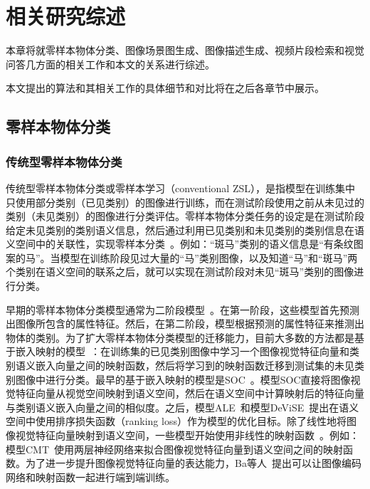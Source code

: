 \chapter{相关研究综述}

本章将就零样本物体分类、图像场景图生成、图像描述生成、视频片段检索和视觉问答几方面的相关工作和本文的关系进行综述。

本文提出的算法和其相关工作的具体细节和对比将在之后各章节中展示。


\section{零样本物体分类}

\subsection{传统型零样本物体分类}
传统型零样本物体分类或零样本学习（conventional ZSL），是指模型在训练集中只使用部分类别（已见类别）的图像进行训练，而在测试阶段使用之前从未见过的类别（未见类别）的图像进行分类评估。零样本物体分类任务的设定是在测试阶段给定未见类别的类别语义信息，然后通过利用已见类别和未见类别的类别信息在语义空间中的关联性，实现零样本分类~\cite{farhadi2009describing,lampert2009learning,romera2015embarrassingly,norouzi2014zero,demirel2017attributes2classname,jiang2017learning}。例如：“斑马”类别的语义信息是“有条纹图案的马”。当模型在训练阶段见过大量的“马”类别图像，以及知道“马”和“斑马”两个类别在语义空间的联系之后，就可以实现在测试阶段对未见“斑马”类别的图像进行分类。

早期的零样本物体分类模型通常为二阶段模型~\cite{lampert2013attribute,norouzi2014zero,al2016recovering,jayaraman2014zero,kankuekul2012online}。在第一阶段，这些模型首先预测出图像所包含的属性特征。然后，在第二阶段，模型根据预测的属性特征来推测出物体的类别。为了扩大零样本物体分类模型的迁移能力，目前大多数的方法都是基于嵌入映射的模型~\cite{palatucci2009zero,frome2013devise,akata2015label,akata2015evaluation,romera2015embarrassingly,xian2016latent,socher2013zero,kodirov2017semantic,li2017zero}：在训练集的已见类别图像中学习一个图像视觉特征向量和类别语义嵌入向量之间的映射函数，然后将学习到的映射函数迁移到测试集的未见类别图像中进行分类。最早的基于嵌入映射的模型是SOC~\cite{palatucci2009zero}。模型SOC直接将图像视觉特征向量从视觉空间映射到语义空间，然后在语义空间中计算映射后的特征向量与类别语义嵌入向量之间的相似度。之后，模型ALE~\cite{akata2015label}和模型DeViSE~\cite{frome2013devise}提出在语义空间中使用排序损失函数（ranking loss）作为模型的优化目标。除了线性地将图像视觉特征向量映射到语义空间，一些模型开始使用非线性的映射函数~\cite{xian2016latent}。例如：模型CMT~\cite{socher2013zero}使用两层神经网络来拟合图像视觉特征向量到语义空间之间的映射函数。为了进一步提升图像视觉特征向量的表达能力，Ba等人~\cite{lei2015predicting}提出可以让图像编码网络和映射函数一起进行端到端训练。

